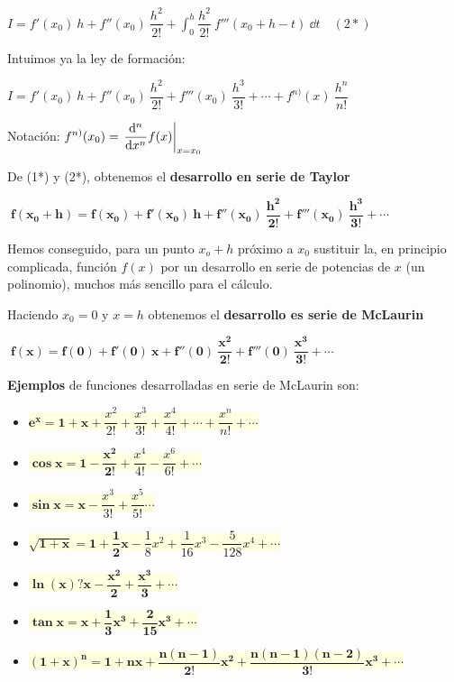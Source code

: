 $I=\displaystyle f'(x_0)\ h + f''(x_0)\ \dfrac {h^2}{2!}+\int_0^h \dfrac {h^2}{2!}\ f'''(x_0+h-t)\ \dd t \quad (2*)$


Intuimos ya la ley de formación:

$I=\displaystyle f'(x_0) \ h +f''(x_0) \ \dfrac {h^2}{2!} + f'''(x_0) \ \dfrac {h^3}{3!}+ \cdots + f^{n)}(x)\ \dfrac {h^n}{n!}$

\textcolor{gris}{Notación: $\displaystyle f^{n)}(x_0)=\eval{\dv[n]{}{x} f(x)}_{x=x_0}$}

De (1*) y (2*), obtenemos el \textbf{desarrollo en serie de Taylor}

$\displaystyle \boxed{ \;\boldsymbol{ f(x_0+h)=f(x_0)+ f'(x_0) \ h +f''(x_0) \ \dfrac {h^2}{2!} + f'''(x_0) \ \dfrac {h^3}{3!}+ \cdots }\; }$

\textcolor{gris}{Hemos conseguido, para un punto $x_o+h$ próximo a $x_0$ sustituir la, en principio complicada, función $f(x)$ por un desarrollo en serie de potencias de $x$ (un polinomio), muchos más sencillo para el cálculo.}


Haciendo $x_0=0$ y $x=h$ obtenemos el \textbf{desarrollo es serie de McLaurin}

$\displaystyle \boxed{ \;\boldsymbol{ f(x)=f(0)+ f'(0) \ x +f''(0) \ \dfrac {x^2}{2!} + f'''(0) \ \dfrac {x^3}{3!}+ \cdots }\; }$


\textbf{Ejemplos} de funciones desarrolladas en serie de McLaurin son:

\begin{itemize}
\item \colorbox{LightYellow}{$\boldsymbol{e^x=1+x+}\displaystyle \dfrac {x^2}{2!}+\dfrac {x^3}{3!}+\dfrac {x^4}{4!}+ \cdots + \dfrac {x^n}{n!}+\cdots$}
\item \colorbox{LightYellow}{$\boldsymbol{\cos x= \displaystyle 1-\dfrac {x^2}{2!}}+\dfrac {x^4}{4!}-\dfrac {x^6}{6!}+ \cdots	$}
\item \colorbox{LightYellow}{$\boldsymbol{\sin x=\displaystyle x}-\displaystyle \dfrac {x^3}{3!}+\dfrac {x^5}{5!}\cdots $}	
\item \colorbox{LightYellow}{$\boldsymbol{\sqrt{1+x}=1+\dfrac 1 2 x}-\dfrac 1 8 x^2 +\dfrac 1 {16}x^3-\dfrac 5 {128}x^4 + \cdots $}	
\item \colorbox{LightYellow}{$\boldsymbol{\ln(x)?x-\dfrac{x^2}{2}+\dfrac{x^3}{3}+\cdots}$}	
\item \colorbox{LightYellow}{$\boldsymbol{\tan x=x+\dfrac 1 3 x^3+\dfrac 2 {15}x^3+\cdots}$}	
\item \colorbox{LightYellow}{$\boldsymbol{(1+x)^n=1+nx+\dfrac{n(n-1)}{2!}x^2+\dfrac{n(n-1)(n-2)}{3!}x^3+\cdots}$}		
\end{itemize}

